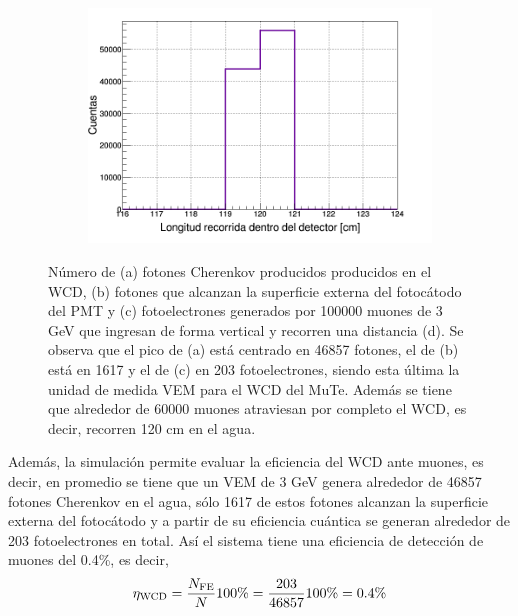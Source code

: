 \documentclass[12pt,oneside,openany,letter]{book}
\begin{document}
\begin{figure}
\begin{subfigure}{0.45\textwidth}
        \caption{}
        \label{fotoelectrones_vem}
    \end{subfigure}
    \begin{subfigure}{0.45\textwidth}
        \includegraphics[width=\textwidth]{images/distancia_vem.png}
        \caption{}
        \label{distancia_vem}
    \end{subfigure}
    \caption[Número de fotones Cherenkov producidos en el WCD, fotones que alcanzan la superficie del fotoc\'atodo del PMT y fotoelectrones generados por muones verticales de 3 GeV]{Número de (a) fotones Cherenkov producidos producidos en el WCD, (b) fotones que alcanzan la superficie externa del fotoc\'atodo del PMT y (c) fotoelectrones generados por 100000 muones de 3 GeV que ingresan de forma vertical y recorren una distancia (d). Se observa que el pico de (a) está centrado en 46857 fotones, el de (b) está en 1617 y el de (c) en 203 fotoelectrones, siendo esta \'ultima la unidad de medida VEM para el WCD del MuTe. Además se tiene que alrededor de 60000 muones atraviesan por completo el WCD, es decir, recorren 120 cm en el agua.}\label{VEM_plots}
\end{figure}

Además, la simulación permite evaluar la eficiencia del WCD ante muones, es decir, en promedio se tiene que un VEM de 3 GeV genera alrededor de 46857 fotones Cherenkov en el agua, sólo 1617 de estos fotones alcanzan la superficie externa del fotoc\'atodo y a partir de su eficiencia cuántica se generan alrededor de 203 fotoelectrones en total. Así el sistema tiene una eficiencia de detección de muones del 0.4\%, es decir, 
\begin{equation}
\eta_{\mathrm{WCD}}=\frac{N_{\mathrm{FE}}}{N} 100\%=\frac{203}{46857}100\%=0\textnormal{.}4\%
\end{equation}
\end{document}
